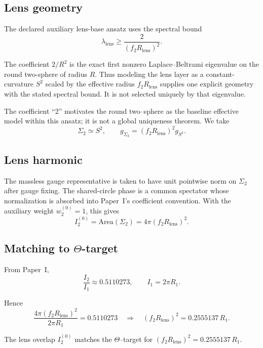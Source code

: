 \documentclass[11pt]{article}
\begin{document}
\subsection{Lens geometry}

The declared auxiliary lens-base ansatz uses the spectral bound
\[
\lambda_{\mathrm{lens}} \ge \frac{2}{(f_2R_{\mathrm{lens}})^2}.
\]

\begin{remark}
The coefficient $2/R^2$ is the exact first nonzero Laplace--Beltrami eigenvalue on the round
two-sphere of radius $R$. Thus modeling the lens layer as a constant-curvature $S^2$ scaled by
the effective radius $f_2R_{\mathrm{lens}}$ supplies one explicit geometry
with the stated spectral bound. It is not selected uniquely by that
eigenvalue.
\end{remark}

The coefficient ``2'' motivates the round two--sphere as the baseline
effective model within this ansatz; it is not a global uniqueness theorem. We take
\[
\Sigma_2 \simeq S^2,
\qquad
g_{\Sigma_2} = (f_2R_{\mathrm{lens}})^2 g_{S^2}.
\]

\subsection{Lens harmonic}

The massless gauge representative is taken to have unit pointwise norm on
$\Sigma_2$ after gauge fixing. The shared-circle phase is a common spectator
whose normalization is absorbed into Paper~I's coefficient convention. With
the auxiliary weight $w_2^{(0)}=1$, this gives
\[
I_2^{(0)} = \mathrm{Area}(\Sigma_2) = 4\pi(f_2R_{\mathrm{lens}})^2.
\]

\subsection{Matching to \texorpdfstring{$\Theta$}{Theta}-target}

From Paper~I,
\[
\frac{I_2}{I_1} \approx 0.5110273,
\qquad I_1 = 2\pi R_1.
\]

Hence
\[
\frac{4\pi(f_2R_{\mathrm{lens}})^2}{2\pi R_1} = 0.5110273
\quad\Rightarrow\quad
(f_2R_{\mathrm{lens}})^2 = 0.2555137\,R_1.
\]

\begin{proposition}
The lens overlap $I_2^{(0)}$ matches the $\Theta$--target
for $(f_2R_{\mathrm{lens}})^2 = 0.2555137\,R_1$.
\end{proposition}
\end{document}
